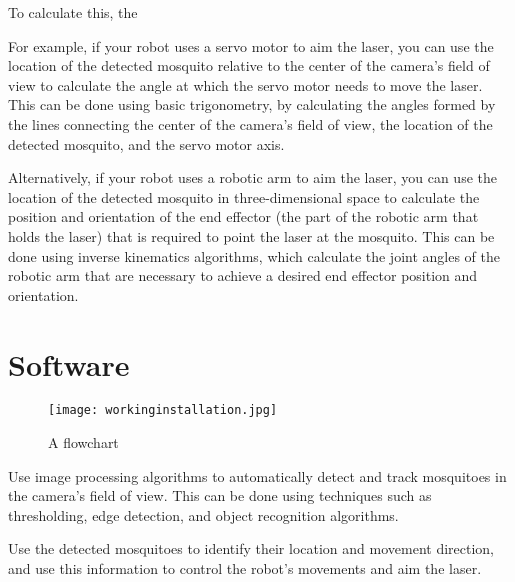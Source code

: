 \documentclass[11pt]{article}
\begin{document}
 	
 	To calculate this, the 

 
 
 	
 	For example, if your robot uses a servo motor to aim the laser, you can use the location of the detected mosquito relative to the center of the camera's field of view to calculate the angle at which the servo motor needs to move the laser. This can be done using basic trigonometry, by calculating the angles formed by the lines connecting the center of the camera's field of view, the location of the detected mosquito, and the servo motor axis.
 	
 	Alternatively, if your robot uses a robotic arm to aim the laser, you can use the location of the detected mosquito in three-dimensional space to calculate the position and orientation of the end effector (the part of the robotic arm that holds the laser) that is required to point the laser at the mosquito. This can be done using inverse kinematics algorithms, which calculate the joint angles of the robotic arm that are necessary to achieve a desired end effector position and orientation.
 	


 	
 
 	
 	
 	
 	







 
 \section{Software}
 
 \begin{center}
 	
 	
 	\begin{figure}[H]
 		\centering
 		\texttt{[image: workinginstallation.jpg]}
 		\caption{A flowchart  }
 		\label{fig:Flowchart}
 	\end{figure}
 \end{center}
 

Use image processing algorithms to automatically detect and track mosquitoes in the camera's field of view. This can be done using techniques such as thresholding, edge detection, and object recognition algorithms.

Use the detected mosquitoes to identify their location and movement direction, and use this information to control the robot's movements and aim the laser.
\end{document}
